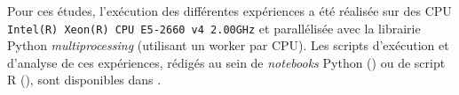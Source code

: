 	\begin{leftBarInformation}
		Pour ces études, l'exécution des différentes expériences a été réalisée sur des CPU \texttt{Intel(R) Xeon(R) CPU E5-2660 v4 \@ 2.00GHz} et parallélisée avec la librairie Python \textit{multiprocessing} (utilisant un worker par CPU).
		Les scripts d'exécution et d'analyse de ces expériences, rédigés au sein de \textit{notebooks} Python (\cite{van-rossum-drake:2009:python-reference-manual}) ou de script R (\cite{r-core-team:2017:language-environment-statistical}), sont disponibles dans \cite{schild:2021:cognitivefactory-interactiveclusteringcomparativestudy}.
	\end{leftBarInformation}
	
	
	\minitoc
	
	\newpage
	
	
	
	\newpage
	
	
	
	\newpage
	
	
	
	\newpage
	
	
	
	\newpage
	
	
	
	\newpage
	
	
	
	\newpage
	
	
	
